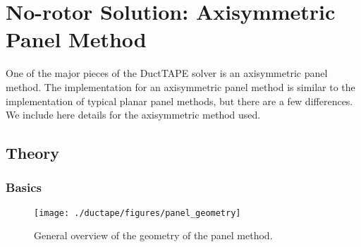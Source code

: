 

\section{No-rotor Solution: Axisymmetric Panel Method}
\label{sec:axisymmetricpanelmethod}

One of the major pieces of the DuctTAPE solver is an axisymmetric panel method.
The implementation for an axisymmetric panel method is similar to the implementation of typical planar panel methods, but there are a few differences.
We include here details for the axisymmetric method used.

\subsection{Theory}
\label{ssec:axisymmetricpaneltheory}

\subsubsection{Basics}

\begin{figure}[h!]
	\centering
	\texttt{[image: ./ductape/figures/panel\_geometry]}
	\caption{General overview of the geometry of the panel method.}
	\label{fig:panel_geometry}
\end{figure}





%
%
%
%

